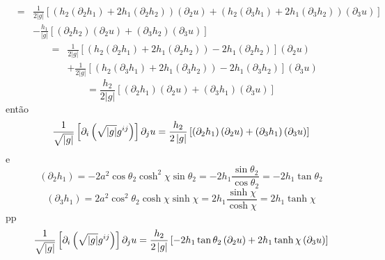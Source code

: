 \documentclass[a4paper,12pt]{article}
\begin{document}
\begin{eqnarray*}
&=&\frac{1}{2\left\vert g\right\vert }\left[ \left( h_{2}\left( \partial
_{2}h_{1}\right) +2h_{1}\left( \partial _{2}h_{2}\right) \right) \left(
\partial _{2}u\right) +\left( h_{2}\left( \partial _{3}h_{1}\right)
+2h_{1}\left( \partial _{3}h_{2}\right) \right) \left( \partial _{3}u\right) %
\right]  \\
&&-\frac{h_{1}}{\left\vert g\right\vert }\left[ \left( \partial
_{2}h_{2}\right) \left( \partial _{2}u\right) +\left( \partial
_{3}h_{2}\right) \left( \partial _{3}u\right) \right] 
\end{eqnarray*}%
\begin{eqnarray*}
&=&\frac{1}{2\left\vert g\right\vert }\left[ \left( h_{2}\left( \partial
_{2}h_{1}\right) +2h_{1}\left( \partial _{2}h_{2}\right) \right)
-2h_{1}\left( \partial _{2}h_{2}\right) \right] \left( \partial _{2}u\right) 
\\
&&+\frac{1}{2\left\vert g\right\vert }\left[ \left( h_{2}\left( \partial
_{3}h_{1}\right) +2h_{1}\left( \partial _{3}h_{2}\right) \right)
-2h_{1}\left( \partial _{3}h_{2}\right) \right] \left( \partial _{3}u\right) 
\end{eqnarray*}%
\begin{equation*}
=\frac{h_{2}}{2\left\vert g\right\vert }\left[ \left( \partial
_{2}h_{1}\right) \left( \partial _{2}u\right) +\left( \partial
_{3}h_{1}\right) \left( \partial _{3}u\right) \right] 
\end{equation*}%
ent\~{a}o%
\begin{equation*}
\frac{1}{\sqrt{\left\vert g\right\vert }}\left[ \partial _{i}\left( \sqrt{%
\left\vert g\right\vert }g^{ij}\right) \right] \partial _{j}u=\frac{h_{2}}{%
2\left\vert g\right\vert }\left[ \left( \partial _{2}h_{1}\right) \left(
\partial _{2}u\right) +\left( \partial _{3}h_{1}\right) \left( \partial
_{3}u\right) \right] 
\end{equation*}%
e%
\begin{equation*}
\left( \partial _{2}h_{1}\right) =-2a^{2}\cos \theta _{2}\cosh ^{2}\chi \sin
\theta _{2}=-2h_{1}\frac{\sin \theta _{2}}{\cos \theta _{2}}=-2h_{1}\tan
\theta _{2}
\end{equation*}%
\begin{equation*}
\left( \partial _{3}h_{1}\right) =2a^{2}\cos ^{2}\theta _{2}\cosh \chi \sinh
\chi =2h_{1}\frac{\sinh \chi }{\cosh \chi }=2h_{1}\tanh \chi 
\end{equation*}%
pp%
\begin{equation*}
\frac{1}{\sqrt{\left\vert g\right\vert }}\left[ \partial _{i}\left( \sqrt{%
\left\vert g\right\vert }g^{ij}\right) \right] \partial _{j}u=\frac{h_{2}}{%
2\left\vert g\right\vert }\left[ -2h_{1}\tan \theta _{2}\left( \partial
_{2}u\right) +2h_{1}\tanh \chi \left( \partial _{3}u\right) \right] 
\end{equation*}%
\end{document}
